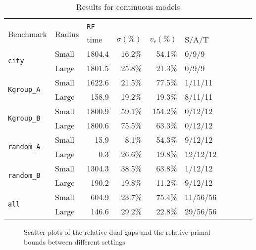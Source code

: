 \documentclass[review]{elsarticle}
\theoremstyle{definition}
\begin{document}
\begin{table}[]
\begin{tabular}{|l|l|*{4}{r}|*{4}{r}}
\cline{1-10}
\multicolumn{10}{c}{}\\
\cline{1-6}
\multirow{2}{*}{Benchmark} & \multirow{2}{*}{Radius}  & \multicolumn{4}{l|}{\texttt{RF}}                                                                                 	& \multicolumn{4}{l}{}                                                                                                    	\\ \cline{3-6}
                  	&  	& \multicolumn{1}{l|}{time} & \multicolumn{1}{l|}{$\sigma(\%)$} & \multicolumn{1}{l|}{$v_r(\%)$} & \multicolumn{1}{l|}{S/A/T} & \multicolumn{1}{l}{} & \multicolumn{1}{l}{} & \multicolumn{1}{l}{} & \multicolumn{1}{l}{}  \\ \cline{1-6}
\multirow{2}{*}{\texttt{city}}&Small & 1804.4 & 16.2\% & 54.1\% & \multicolumn{1}{l|}{0/9/9} \\
&Large & 1801.5 & 25.8\% & 21.3\% & \multicolumn{1}{l|}{0/9/9} \\  \cline{1-1}
\multirow{2}{*}{\texttt{Kgroup\_A}}&Small & 1622.6 & 21.5\% & 77.5\% & \multicolumn{1}{l|}{1/11/11} \\
&Large & 158.9 & 19.2\% & 19.3\% & \multicolumn{1}{l|}{8/11/11} \\  \cline{1-1}
\multirow{2}{*}{\texttt{Kgroup\_B}}&Small & 1800.9 & 59.1\% & 154.2\% & \multicolumn{1}{l|}{0/12/12} \\
&Large & 1800.6 & 75.5\% & 63.3\% & \multicolumn{1}{l|}{0/12/12} \\  \cline{1-1}
\multirow{2}{*}{\texttt{random\_A}}&Small & 15.9 & 8.1\% & 54.3\% & \multicolumn{1}{l|}{9/12/12} \\
&Large & 0.3 & 26.6\% & 19.8\% & \multicolumn{1}{l|}{12/12/12} \\  \cline{1-1}
\multirow{2}{*}{\texttt{random\_B}}&Small & 1304.3 & 38.5\% & 63.8\% & \multicolumn{1}{l|}{1/12/12} \\
&Large & 190.2 & 19.8\% & 11.2\% & \multicolumn{1}{l|}{9/12/12} \\  \cline{1-6}
\multirow{2}{*}{\texttt{all}}&Small & 604.9 & 23.7\% & 75.4\% & \multicolumn{1}{l|}{11/56/56} \\
&Large & 146.6 & 29.2\% & 22.8\% & \multicolumn{1}{l|}{29/56/56} \\
\cline{1-6}
\end{tabular}

\caption{Results for continuous models} \label{tab.cm}
\end{table}



 \begin{figure}[!h]
\caption{Scatter plots of the relative dual gaps and the relative primal bounds between different settings}
\label{fig.scatter5}
\end{figure}
\end{document}

